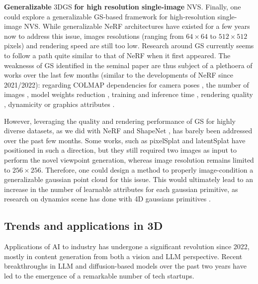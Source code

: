 %
\noindent \textbf{Generalizable} 3D\ac{GS} \textbf{for high resolution single-image} \ac{NVS}. Finally, one could explore a generalizable \ac{GS}-based framework for high-resolution single-image \ac{NVS}. While generalizable \ac{NeRF} architectures have existed for a few years now \citep{yu2021pixelnerf,li2022symmnerf,lin2023vision} to address this issue, images resolutions (ranging from $64\times 64$ to $512\times 512$ pixels) and rendering speed are still too low. Research around \ac{GS} currently seems to follow a path quite similar to that of \ac{NeRF} when it first appeared. The weaknesss of \ac{GS}  identified in the seminal paper \citep{kerbl20233d} are thus subject of a plethoera of works over the last few months (similar to the developments of \ac{NeRF} since 2021/2022): regarding COLMAP dependencies for camera poses \citep{fu2023colmapfree}, the number of images \citep{xiong2023sparsegs,yang2024gaussianobject}, model weights reduction \citep{niedermayr2023compressed}, training and inference time \citep{fan2024instantsplat}, rendering quality \citep{yu2023mip}, dynamicity \citep{luiten2023dynamic} or graphics attributes \citep{wu2024deferredgs}.  

However, leveraging the quality and rendering performance of \ac{GS} for highly diverse datasets, as we did with NeRF \citep{landreau2024epinerf} and ShapeNet \citep{chang2015shapenet}, has barely been addressed over the past few months. Some works, such as pixelSplat \citep{charatan23pixelsplat} and latentSplat \citep{wewer24latentsplat} have positioned in such a direction, but they still required two images as input to perform the novel viewpoint generation, whereas image resolution remains limited to $256\times 256$. Therefore, one could design a method to properly image-condition a generalizable gaussian point cloud for this issue. This would ultimately lead to an increase in the number of learnable attributes for each gaussian primitive, as research on dynamics scene has done with 4D gaussians primitives \citep{luiten2023dynamic,gao2024gaussianflow}.  

\subsection{Trends and applications in 3D}
Applications of \ac{AI} to industry has undergone a significant revolution since 2022, mostly in content generation from both a vision and \ac{LLM} perspective. Recent breakthroughs in \ac{LLM} and diffusion-based models over the past two years have led to the emergence of a remarkable number of tech startups. 

